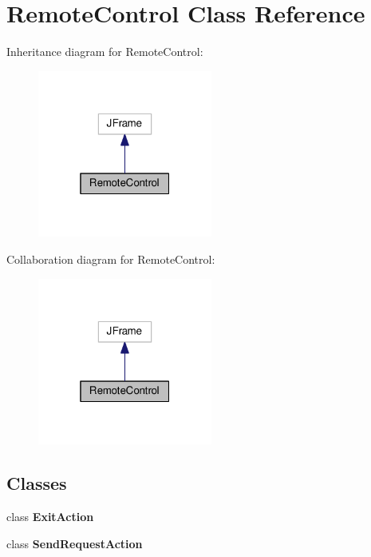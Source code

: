 \hypertarget{classRemoteControl}{}\section{Remote\+Control Class Reference}
\label{classRemoteControl}


Inheritance diagram for Remote\+Control\+:
\nopagebreak
\begin{figure}[H]
\begin{center}
\leavevmode
\includegraphics[width=163pt]{classRemoteControl__inherit__graph}
\end{center}
\end{figure}


Collaboration diagram for Remote\+Control\+:
\nopagebreak
\begin{figure}[H]
\begin{center}
\leavevmode
\includegraphics[width=163pt]{classRemoteControl__coll__graph}
\end{center}
\end{figure}
\subsection*{Classes}
\begin{DoxyCompactItemize}
\item 
class {\bfseries Exit\+Action}
\item 
class {\bfseries Send\+Request\+Action}
\end{DoxyCompactItemize}
